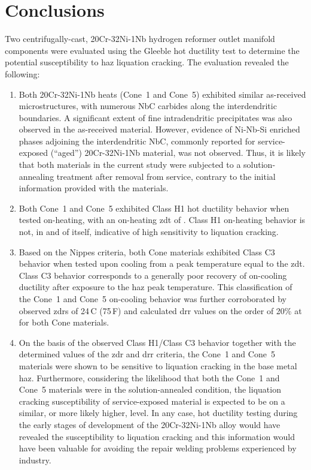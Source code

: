 \chapter{Conclusions} \label{ch:conclusions}
Two centrifugally-cast, 20Cr-32Ni-1Nb hydrogen reformer outlet manifold components were evaluated using the Gleeble\textregistered{} hot ductility test to determine the potential susceptibility to \gls{haz} liquation cracking.  The evaluation revealed the following:

\begin{enumerate}
\item Both 20Cr-32Ni-1Nb heats (Cone~1 and Cone~5) exhibited similar as-received microstructures, with numerous NbC carbides along the interdendritic boundaries. A significant extent of fine intradendritic precipitates was also observed in the as-received material. However, evidence of Ni-Nb-Si enriched phases adjoining the interdendritic NbC, commonly reported for service-exposed (“aged”) 20Cr-32Ni-1Nb material, was not observed. Thus, it is likely that both materials in the current study were subjected to a solution-annealing treatment after removal from service, contrary to the initial information provided with the materials.
\item Both Cone~1 and Cone~5 exhibited Class H1 hot ductility behavior when tested on-heating, with an on-heating \gls{zdt} of . Class H1 on-heating behavior is not, in and of itself, indicative of high sensitivity to liquation cracking.
\item Based on the Nippes criteria, both Cone materials exhibited Class C3 behavior when tested upon cooling from a peak temperature equal to the \gls{zdt}.  Class C3 behavior corresponds to a generally poor recovery of on-cooling ductility after exposure to the \gls{haz} peak temperature.  This classification of the Cone~1 and Cone~5 on-cooling behavior was further corroborated by observed \gls{zdr}s of 24\,C\textdegree{} (75\,F\textdegree{}) and calculated \gls{drr} values on the order of 20\% at  for both Cone materials.
\item On the basis of the observed Class H1/Class C3 behavior together with the determined values of the \gls{zdr} and \gls{drr} criteria, the Cone~1 and Cone~5 materials were shown to be sensitive to liquation cracking in the base metal \gls{haz}. Furthermore, considering the likelihood that both the Cone~1 and Cone~5 materials were in the solution-annealed condition, the liquation cracking susceptibility of service-exposed material is expected to be on a similar, or more likely higher, level. In any case, hot ductility testing during the early stages of development of the 20Cr-32Ni-1Nb alloy would have revealed the susceptibility to liquation cracking and this information would have been valuable for avoiding the repair welding problems experienced by industry.

\end{enumerate}
